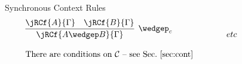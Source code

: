 \documentclass{llncs}
\begin{document}
\begin{figure}[t]
%
{\sc Synchronous Context Rules}
\[\begin{array}{lcl}
\infer[{\wedgep_c}]{\jRCf{A \wedgep B}{\Gamma}}
{\jRCf{A}{\Gamma} &  \jRCf{B}{\Gamma}} 
& \qquad & etc\\ \\
\mbox{There are conditions on $\mathcal{C}$ -- see Sec.~\ref{sec:cont}}
  \end{array}
\]


\end{figure}
\end{document}
